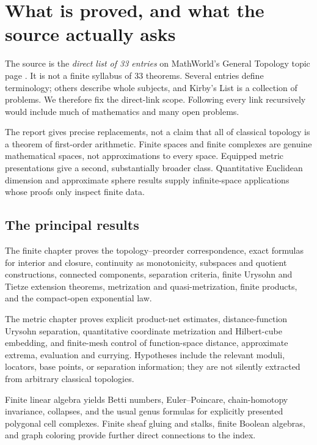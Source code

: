 \section{What is proved, and what the source actually asks}
\label{sec:scope}

The source is the \emph{direct list of 33 entries} on MathWorld's General Topology topic page \cite{MWIndex}. It is not a finite syllabus of 33 theorems. Several entries define terminology; others describe whole subjects, and Kirby's List is a collection of problems. We therefore fix the direct-link scope. Following every link recursively would include much of mathematics and many open problems.

The report gives precise replacements, not a claim that all of classical topology is a theorem of first-order arithmetic. Finite spaces and finite complexes are genuine mathematical spaces, not approximations to every space. Equipped metric presentations give a second, substantially broader class. Quantitative Euclidean dimension and approximate sphere results supply infinite-space applications whose proofs only inspect finite data.

\subsection{The principal results}

The finite chapter proves the topology--preorder correspondence, exact formulas for interior and closure, continuity as monotonicity, subspaces and quotient constructions, connected components, separation criteria, finite Urysohn and Tietze extension theorems, metrization and quasi-metrization, finite products, and the compact-open exponential law.

The metric chapter proves explicit product-net estimates, distance-function Urysohn separation, quantitative coordinate metrization and Hilbert-cube embedding, and finite-mesh control of function-space distance, approximate extrema, evaluation and currying. Hypotheses include the relevant moduli, locators, base points, or separation information; they are not silently extracted from arbitrary classical topologies.

Finite linear algebra yields Betti numbers, Euler--Poincare, chain-homotopy invariance, collapses, and the usual genus formulas for explicitly presented polygonal cell complexes. Finite sheaf gluing and stalks, finite Boolean algebras, and graph coloring provide further direct connections to the index.

